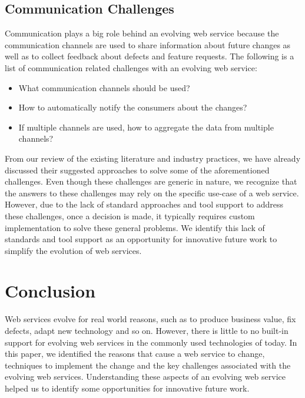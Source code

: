 \documentclass[runningheads,a4paper]{llncs}
\begin{document}
\subsection{Communication Challenges} %
\label{sub:communication_challenges}
Communication plays a big role behind an evolving web service because the communication channels are used to share information about future changes as well as to collect feedback about defects and feature requests. The following is a list of communication related challenges with an evolving web service:
\begin{itemize}
  \item What communication channels should be used?
  \item How to automatically notify the consumers about the changes?
  \item If multiple channels are used, how to aggregate the data from multiple channels?
\end{itemize}


From our review of the existing literature and industry practices, we have already discussed their suggested approaches to solve some of the aforementioned challenges. Even though these challenges are generic in nature, we recognize that the answers to these challenges may rely on the specific use-case of a web service. However, due to the lack of standard approaches and tool support to address these challenges, once a decision is made, it typically requires custom implementation to solve these general problems. We identify this lack of standards and tool support as an opportunity for innovative future work to simplify the evolution of web services.

\section{Conclusion} %
\label{sec:conclusion}
Web services evolve for real world reasons, such as to produce business value, fix defects, adapt new technology and so on. However, there is little to no built-in support for evolving web services in the commonly used technologies of today. In this paper, we identified the reasons that cause a web service to change, techniques to implement the change and the key challenges associated with the evolving web services. Understanding these aspects of an evolving web service helped us to identify some opportunities for innovative future work.
\end{document}
